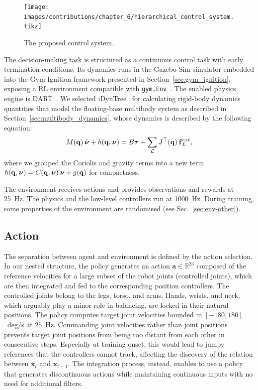 \begin{figure}
    \centering
    \texttt{[image: images/contributions/chapter\_6/hierarchical\_control\_system.tikz]}
    \caption{The proposed control system.}
    \label{fig:hierarchical}
\end{figure}

The decision-making task is structured as a continuous control task with early termination conditions.
Its dynamics runs in the Gazebo Sim simulator embedded into the Gym-Ignition framework presented in Section~\ref{sec:gym_ignition}, exposing a \ac{RL} environment compatible with \verb|gym.Env|~\parencite{brockman_openai_2016}.
The enabled physics engine is DART~\parencite{lee_dart_2018}.
We selected iDynTree~\parencite{nori_icub_2015} for calculating rigid-body dynamics quantities that model the floating-base multibody system as described in Section~\ref{sec:multibody_dynamics}, whose dynamics is described by the following equation:
%
\begin{equation}
    M(\mathbf{q}) \prescript{}{}{\dot{\boldsymbol{\nu}}} + h(\mathbf{q}, \prescript{}{}{\boldsymbol{\nu}}) = B \boldsymbol{\tau} + \sum_{\mathcal{L}} J^\top(\mathbf{q}) \prescript{}{}{\mathbf{f}}_L^{ext}
    ,
\end{equation}
%
where we grouped the Coriolis and gravity terms into a new term $h(\mathbf{q}, \prescript{}{}{\boldsymbol{\nu}}) = C(\mathbf{q}, \prescript{}{}{\boldsymbol{\nu}}) \prescript{}{}{\boldsymbol{\nu}} + g(\mathbf{q})$ for compactness.

The environment receives actions and provides observations and rewards at 25~Hz.
The physics and the low-level \pid controllers run at 1000~Hz.
During training, some properties of the environment are randomised (see Sec.~\ref{sec:env-other}).

\subsection{Action}

The separation between agent and environment is defined by the  action selection.
In our nested structure, the policy generates an action $\mathbf{a} \in \mathbb{R}^{23}$ composed of the reference velocities for a large subset of the robot joints (controlled joints), which are then integrated and fed to the corresponding \pid position controllers.
The controlled joints belong to the legs, torso, and arms.
Hands, wrists, and neck, which arguably play a minor role in balancing, are locked in their natural positions.
The policy computes target joint velocities bounded in $[-180,180]$~deg/s at $25$~Hz.
Commanding joint velocities rather than joint positions prevents target joint positions from being too distant from each other in consecutive steps.
Especially at training onset, this would lead to jumpy references that the \pid controllers cannot track, affecting the discovery of the relation between $\mathbf{x}_t$ and $\mathbf{x}_{t+1}$.
The integration process, instead, enables to use a policy that generates discontinuous actions while maintaining continuous \pid inputs with no need for additional filters.

